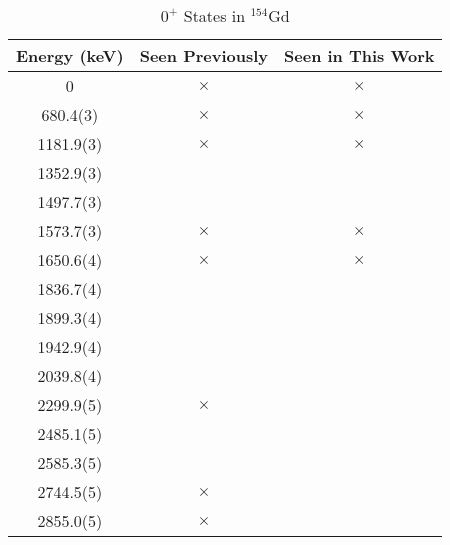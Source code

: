 \begin{table}[]
    \centering
    \begin{tabular}{c|c|c}
        Energy (keV) & Seen Previously & Seen in This Work  \\
        \toprule
        0 & $\times$ & $\times$\\
        680.4(3) & $\times$ & $\times$\\
        1181.9(3) & $\times$ & $\times$\\
        1352.9(3) & & \\
        1497.7(3) & & \\
        1573.7(3) & $\times$ & $\times$\\
        1650.6(4) & $\times$ & $\times$\\
        1836.7(4) & & \\
        1899.3(4) & & \\
        1942.9(4) & & \\
        2039.8(4) & & \\
        2299.9(5) & $\times$ &\\
        2485.1(5) & & \\
        2585.3(5) & & \\
        2744.5(5) & $\times$ &\\
        2855.0(5) & $\times$ &\\
        \bottomrule
    \end{tabular}
    \caption{$0^+$ States in $^{154}$Gd}
    \label{tab:0plus_154}
\end{table}